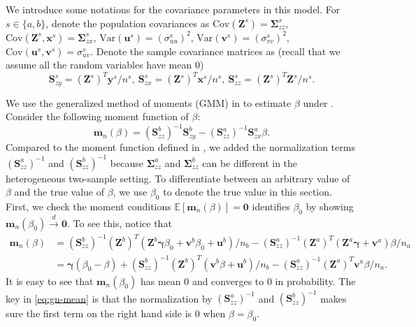 \documentclass[preprint]{imsart}
\begin{document}
We introduce some notations for the covariance parameters in this
model. For $s \in \{a,b\}$, denote the population covariances as
$\mathrm{Cov}(\mathbf{Z}^s) = \bm{\Sigma}^s_{zz}$,
$\mathrm{Cov}(\mathbf{Z}^s,\mathbf{x}^s) = \bm{\Sigma}_{zx}^s$,
$\mathrm{Var}(\mathbf{u}^s) = (\sigma_{uu}^s)^2$,
$\mathrm{Var}(\mathbf{v}^s) = (\sigma_{vv}^s)^2$,
$\mathrm{Cov}(\mathbf{u}^s,\mathbf{v}^s) =
\sigma_{uv}^s$. Denote the sample covariance matrices as (recall that
we assume all the random variables have mean $0$)
\[
\mathbf{S}^s_{zy} = (\mathbf{Z}^s)^T\mathbf{y}^s/n^s,~\mathbf{S}^s_{zx} =
(\mathbf{Z}^s)^T \mathbf{x}^s/n^s,~\mathbf{S}^s_{zz} = (\mathbf{Z}^s)^T
\mathbf{Z}^s/n^s.
\]

We use the generalized method of moments (GMM) in
\citet{hansen1982large} to estimate $\beta$ under
. Consider
the following moment function of $\beta$:
\[
\mathbf{m}_n(\beta) = (\mathbf{S}^b_{zz})^{-1} \mathbf{S}^b_{zy} -
(\mathbf{S}^a_{zz})^{-1} \mathbf{S}^a_{zx} \beta.
\]
Compared to the moment function defined in \citet{angrist1992effect},
we added the normalization terms $(\mathbf{S}^a_{zz})^{-1}$ and
$(\mathbf{S}^b_{zz})^{-1}$ because $\bm{\Sigma}_{zz}^a$ and
$\bm{\Sigma}_{zz}^b$ can be different in the heterogeneous two-sample
setting. To differentiate between an arbitrary value of $\beta$ and
the true value of $\beta$, we use $\beta_0$ to denote the true value
in this section. First, we check the moment conditions $\mathbb{E}[\mathbf{m}_n(\beta)] =
\mathbf{0}$ identifies $\beta_0$ by showing
$\mathbf{m}_n(\beta_0) \overset{d}{\to} \mathbf{0}$. To see this, notice
that
\begin{equation} \label{eq:gn-mean}
  \begin{split}
    \mathbf{m}_n(\beta) &= (\mathbf{S}^b_{zz})^{-1} (\mathbf{Z}^b)^T(\mathbf{Z}^b
    \bm{\gamma} \beta_0 + \mathbf{v}^b \beta_0 + \mathbf{u}^b) / n_b -
    (\mathbf{S}^a_{zz})^{-1} (\mathbf{Z}^a)^T (\mathbf{Z}^a \bm{\gamma} +
    \mathbf{v}^a) \beta /n_a \\
    &= \bm \gamma (\beta_0 - \beta) + (\mathbf{S}^b_{zz})^{-1} (\mathbf{Z}^b)^T(\mathbf{v}^b \beta +
    \mathbf{u}^b) / n_b - (\mathbf{S}^a_{zz})^{-1} (\mathbf{Z}^a)^T
    \mathbf{v}^a \beta /n_a.
  \end{split}
\end{equation}
It is easy to see that $\mathbf{m}_n(\beta_0)$ has mean $0$ and converges to $0$
in probability. The key in \eqref{eq:gn-mean} is that the normalization by
$(\mathbf{S}^a_{zz})^{-1}$ and $(\mathbf{S}^b_{zz})^{-1}$ makes sure
the first term on the right hand side is $0$ when $\beta = \beta_0$.
\end{document}
